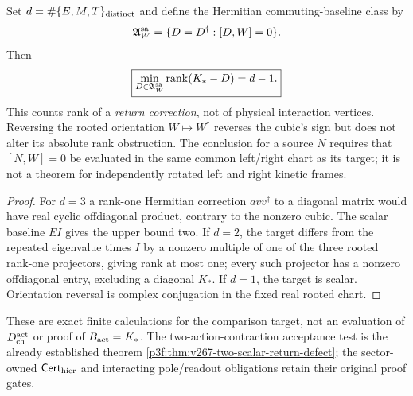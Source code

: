 \documentclass[11pt,a4paper]{article}
\begin{document}
\begin{proposition}
\label{p5d:prop:v158-return-rank-strata-check}
Set $d=\#\{E,M,T\}_{\rm distinct}$ and define the
Hermitian commuting-baseline class by
\[
\mathfrak A_W^{\rm sa}=\{D=D^\dagger:[D,W]=0\}.
\]
Then
\[
 \boxed{\min_{D\in\mathfrak A_W^{\rm sa}}\operatorname{rank}(K_*-D)=d-1.}
\]
This counts rank of a \emph{return correction}, not of physical
interaction vertices.  Reversing the rooted orientation
$W\mapsto W^\dagger$ reverses the cubic's sign but does not alter
its absolute rank obstruction.  The conclusion for a source $N$
requires that $[N,W]=0$ be evaluated in the same common left/right
chart as its target; it is not a theorem for independently rotated
left and right kinetic frames.
\end{proposition}
\begin{proof}
For $d=3$ a rank-one Hermitian correction $a vv^\dagger$ to
a diagonal matrix would have real cyclic offdiagonal product,
contrary to the nonzero cubic.  The scalar baseline $EI$ gives
the upper bound two.  If $d=2$, the target differs from the repeated
eigenvalue times $I$ by a nonzero multiple of one of the three
rooted rank-one projectors, giving rank at most one; every such
projector has a nonzero offdiagonal entry, excluding a diagonal
$K_*$.  If $d=1$, the target is scalar.  Orientation reversal is
complex conjugation in the fixed real rooted chart.
\end{proof}
\begin{remark}
\label{p5d:rem:v158-two-contact-proof-boundary}
These are exact finite calculations for the comparison target,
not an evaluation of $D_{\rm ch}^{\rm act}$ or proof of
$B_{\rm act}=K_*$.  The two-action-contraction acceptance test is
the already established theorem
\ref{p3f:thm:v267-two-scalar-return-defect}; the sector-owned
$\mathsf{Cert}_{\rm hier}$ and interacting pole/readout obligations
retain their original proof gates.
\end{remark}
\end{document}

